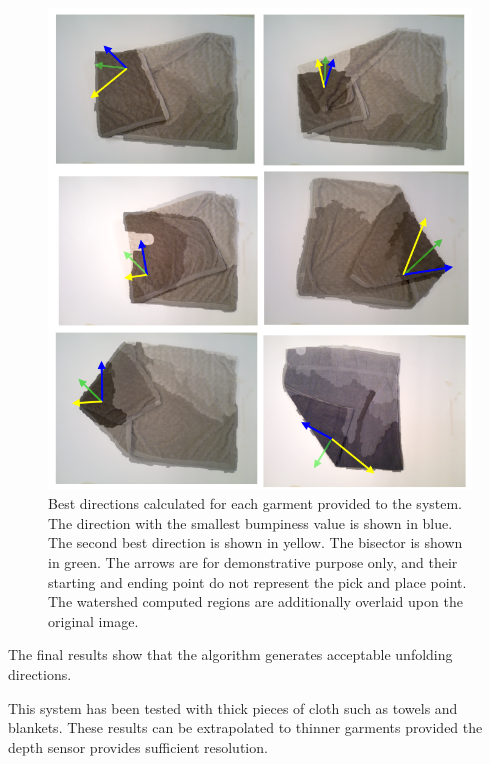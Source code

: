 \begin{figure}[thpb]
    \centering
    \includegraphics[width=\textwidth]
    {figures/directions_several.png}
    \caption{Best directions calculated for each garment provided to the system. The direction with the smallest bumpiness value is shown in blue. The second best direction is shown in yellow. The bisector is shown in green. The arrows are for demonstrative purpose only, and their starting and ending point do not represent the pick and place point. The watershed computed regions are additionally overlaid upon the original image.}
    \label{directions_several}
\end{figure}

The final results show that the algorithm generates acceptable unfolding directions.

This system has been tested with thick pieces of cloth such as towels and blankets. These results can be extrapolated to thinner garments provided the depth sensor provides sufficient resolution.
